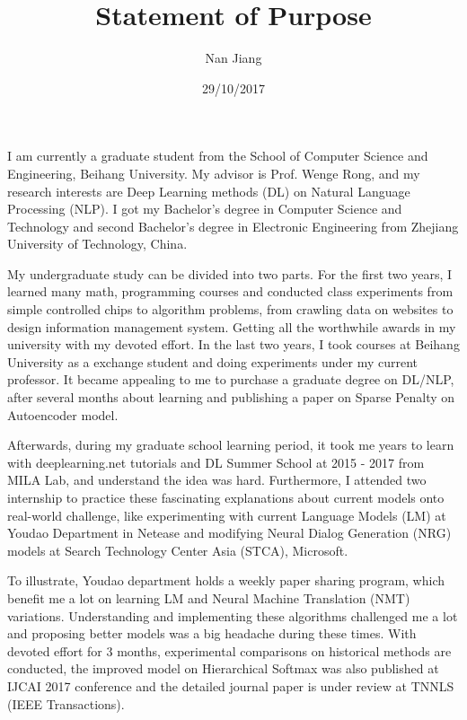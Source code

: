 \documentclass{article}
\title{Statement of Purpose}
\author{Nan Jiang}
\date{29/10/2017}
\begin{document}
  \maketitle%
  \thispagestyle{empty}
  \vspace{16pt}

I am currently a graduate student from the School of Computer Science and Engineering, Beihang University. My advisor is Prof. Wenge Rong, and my research interests are Deep Learning methods (DL) on Natural Language Processing (NLP). I got my Bachelor's degree in Computer Science and Technology and second Bachelor's degree in Electronic Engineering from Zhejiang University of Technology, China.

My undergraduate study can be divided into two parts. For the first two years, I learned many math, programming courses and conducted class experiments from simple controlled chips to algorithm problems, from crawling data on websites to design information management system. Getting all the worthwhile awards in my university with my devoted effort. In the last two years, I took courses at Beihang University as a exchange student and doing experiments under my current professor. It became appealing to me to purchase a graduate degree on DL/NLP, after several months about learning and publishing a paper on Sparse Penalty on Autoencoder model.

Afterwards, during my graduate school learning period,  it took me years to learn with deeplearning.net tutorials and DL Summer School at 2015 - 2017 from MILA Lab, and understand the idea was hard. Furthermore, I attended two internship to practice these fascinating explanations about current models onto real-world challenge, like experimenting with current Language Models (LM) at Youdao Department in Netease and modifying Neural Dialog Generation (NRG) models at Search Technology Center Asia (STCA), Microsoft.

To illustrate, Youdao department holds a weekly paper sharing program, which benefit me a lot on learning LM and Neural Machine Translation (NMT) variations. Understanding and implementing these algorithms challenged me a lot and proposing better models was a big headache during these times. With devoted effort for 3 months, experimental comparisons on historical methods are conducted, the improved model on Hierarchical Softmax was also published at IJCAI 2017 conference and the detailed journal paper is under review at TNNLS (IEEE Transactions).
\end{document}
